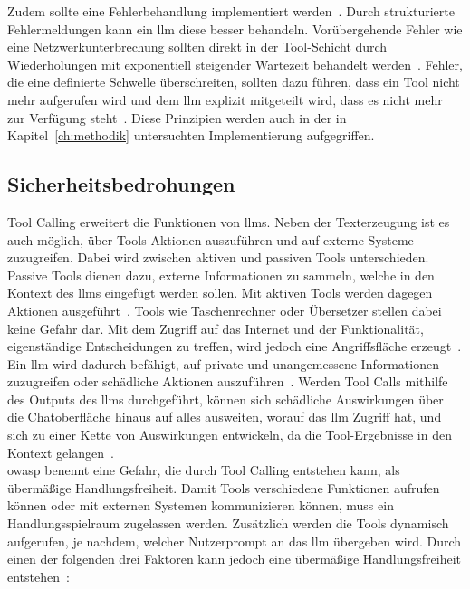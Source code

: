 Zudem sollte eine Fehlerbehandlung implementiert werden~\cite{tc03}. Durch strukturierte Fehlermeldungen kann ein \ac{llm} diese besser behandeln. Vorübergehende Fehler
wie eine Netzwerkunterbrechung sollten direkt in der Tool-Schicht durch Wiederholungen mit exponentiell steigender Wartezeit behandelt werden~\cite{tc03}.
Fehler, die eine definierte Schwelle überschreiten, sollten dazu führen, dass ein Tool nicht mehr aufgerufen wird und dem \ac{llm} explizit mitgeteilt wird, dass 
es nicht mehr zur Verfügung steht~\cite{tc03}. Diese Prinzipien werden auch in der in Kapitel~\ref{ch:methodik} untersuchten Implementierung aufgegriffen.

\subsection{Sicherheitsbedrohungen}\label{subsec:sicherheitsbedrohungen}

Tool Calling erweitert die Funktionen von \acp{llm}. Neben der Texterzeugung ist es auch möglich, über Tools Aktionen auszuführen 
und auf externe Systeme zuzugreifen. Dabei wird zwischen aktiven und passiven Tools unterschieden. Passive Tools dienen dazu, externe Informationen zu sammeln, 
welche in den Kontext des \acp{llm} eingefügt werden sollen. Mit aktiven Tools werden dagegen Aktionen ausgeführt~\cite[21]{tc09}. Tools wie Taschenrechner oder
Übersetzer stellen dabei keine Gefahr dar. Mit dem Zugriff auf das Internet
und der Funktionalität, eigenständige Entscheidungen zu treffen, wird jedoch eine Angriffsfläche erzeugt~\cite[26]{tc11}. Ein \ac{llm} wird dadurch befähigt, auf 
private und 
unangemessene Informationen zuzugreifen oder schädliche Aktionen auszuführen~\cite[10]{tc15}. Werden Tool Calls mithilfe des Outputs des \acp{llm} durchgeführt, können 
sich schädliche Auswirkungen über die Chatoberfläche hinaus auf alles ausweiten, worauf das \ac{llm} Zugriff hat, und sich zu einer Kette von Auswirkungen entwickeln, da
die Tool-Ergebnisse in den Kontext gelangen~\cite[10]{pi24}. \\
\ac{owasp} benennt eine Gefahr, die durch Tool Calling entstehen kann, als übermäßige Handlungsfreiheit. Damit Tools verschiedene Funktionen aufrufen können oder mit 
externen Systemen kommunizieren können, muss ein Handlungsspielraum zugelassen werden. Zusätzlich werden die Tools dynamisch aufgerufen, je nachdem, welcher 
Nutzerprompt an das \ac{llm} übergeben wird. Durch einen der folgenden drei Faktoren kann jedoch eine übermäßige Handlungsfreiheit entstehen~\cite[23]{pi24}:

